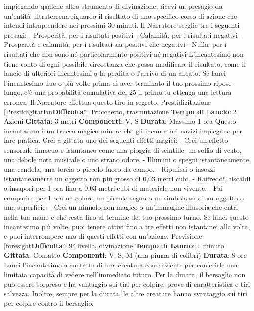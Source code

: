 \begin{multicols}{2}
impiegando qualche altro strumento di divinazione,
ricevi un presagio da un’entità ultraterrena riguardo il
risultato di uno specifico corso di azione che intendi
intraprendere nei prossimi 30 minuti. Il Narratore sceglie tra i
seguenti presagi:
- Prosperità, per i risultati positivi
- Calamità, per i risultati negativi
- Prosperità e calamità, per i risultati sia positivi che
negativi
- Nulla, per i risultati che non sono né particolarmente
positivi né negativi
L’incantesimo non tiene conto di ogni possibile
circostanza che possa modificare il risultato, come il
lancio di ulteriori incantesimi o la perdita o l’arrivo di un
alleato.
Se lanci l’incantesimo due o più volte prima di aver
terminato il tuo prossimo riposo lungo, c’è una
probabilità cumulativa del 25%
il primo tu ottenga una lettura erronea. Il Narratore effettua
questo tiro in segreto.
Prestidigitazione
[Prestidigitation\textbf{Difficolta'}:
Trucchetto, trasmutazione
\textbf{Tempo di Lancio}: 2 Azioni
\textbf{Gittata}: 3 metri
\textbf{Componenti}: V, S
\textbf{Durata}: Massimo 1 ora
Questo incantesimo è un trucco magico minore che gli
incantatori novizi impiegano per fare pratica. Crei a
gittata uno dei seguenti effetti magici:
- Crei un effetto sensoriale innocuo e istantaneo
come una pioggia di scintille, un soffio di vento, una
debole nota musicale o uno strano odore.
- Illumini o spegni istantaneamente una candela, una
torcia o piccolo fuoco da campo.
- Ripulisci o insozzi istantaneamente un oggetto non
più grosso di 0,03 metri cubi.
- Raffreddi, riscaldi o insapori per 1 ora fino a 0,03
metri cubi di materiale non vivente.
- Fai comparire per 1 ora un colore, un piccolo segno
o un simbolo su di un oggetto o una superficie.
- Crei un ninnolo non magico o un’immagine illusoria
che entri nella tua mano e che resta fino al termine
del tuo prossimo turno.
Se lanci questo incantesimo più volte, puoi tenere attivi
fino a tre effetti non istantanei alla volta, e puoi
interrompere uno di questi effetti con un’azione.
Previsione
[foresight\textbf{Difficolta'}:
9° livello, divinazione
\textbf{Tempo di Lancio}: 1 minuto
\textbf{Gittata}: Contatto
\textbf{Componenti}: V, S, M (una piuma di colibrì)
\textbf{Durata}: 8 ore
Lanci l’incantesimo a contatto di una creatura
consenziente per conferirle una limitata capacità di
vedere nell’immediato futuro. Per la durata, il bersaglio
non può essere sorpreso e ha vantaggio sui tiri per
colpire, prove di caratteristica e tiri salvezza. Inoltre,
sempre per la durata, le altre creature hanno
svantaggio sui tiri per colpire contro il bersaglio.

\end{multicols}
